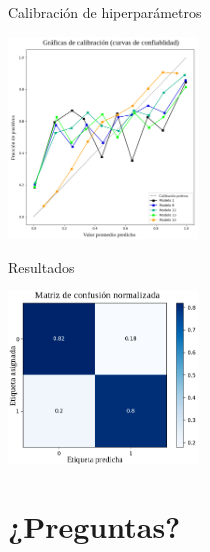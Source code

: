 \documentclass[presentation]{beamer}
\begin{document}
\begin{frame}[label={sec:org42ebe9b}]{Calibración de hiperparámetros}
\begin{center}
\includegraphics[width=190px]{images/calibration.png}
\end{center}
\end{frame}
\begin{frame}[label={sec:orgc0d703b}]{Resultados}
\begin{center}
\includegraphics[width=190px]{images/confusion.png}
\end{center}
\end{frame}

\section{¿Preguntas?}
\label{sec:org7391999}
\end{document}
